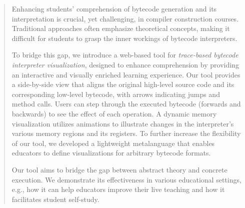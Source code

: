 \documentclass[conference]{IEEEtran}
\begin{document}
\begin{abstract}

Enhancing students' comprehension of bytecode generation and its interpretation is crucial, yet challenging, in compiler construction courses. 
Traditional approaches often emphasize theoretical concepts, making it difficult for students to grasp the inner workings of bytecode interpreters.

To bridge this gap, we introduce a web-based tool for \emph{trace-based bytecode interpreter visualization}, designed to enhance comprehension by providing an interactive and visually enriched learning experience. 
Our tool provides a side-by-side view that aligns the original high-level source code and its corresponding low-level bytecode, with arrows indicating jumps and method calls.
Users can step through the executed bytecode (forwards and backwards) to see the effect of each operation.
A dynamic memory visualization utilizes animations to illustrate changes in the interpreter's various memory regions and its registers.
To further increase the flexibility of our tool, we developed a lightweight metalanguage that enables educators to define visualizations for arbitrary bytecode formats.

Our tool aims to bridge the gap between abstract theory and concrete execution.
We demonstrate its effectiveness in various educational settings, e.g., how it can help educators improve their live teaching and how it facilitates student self-study.



\end{abstract}
\end{document}
